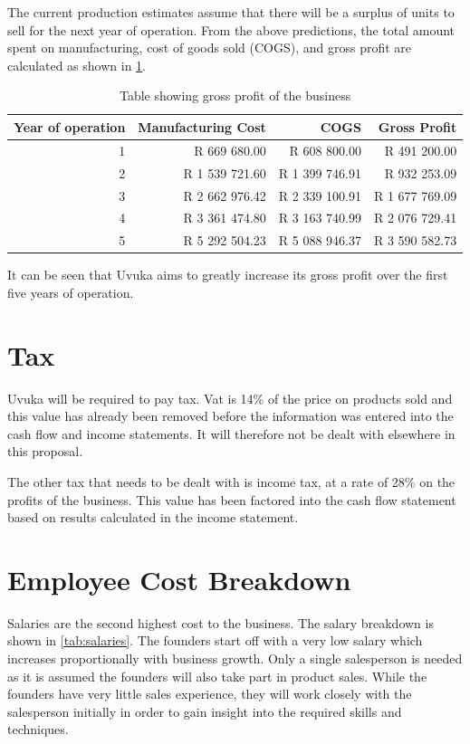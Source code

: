 The current production estimates assume that there will be a surplus of units to sell for the next year of operation. From the above predictions, the total amount spent on manufacturing, cost of goods sold (COGS), and gross profit are calculated as shown in \cref{tab:GrossProfit}. 

\begin{table}[htbp]
  \centering
  \caption{Table showing gross profit of the business}
    \begin{tabular}{rrrr}
    \toprule
    Year of operation & Manufacturing Cost & COGS  & Gross Profit \\
    \midrule
    1     & R 669 680.00 & R 608 800.00 & R 491 200.00 \\
    2     & R 1 539 721.60 & R 1 399 746.91 & R 932 253.09 \\
    3     & R 2 662 976.42 & R 2 339 100.91 & R 1 677 769.09 \\
    4     & R 3 361 474.80 & R 3 163 740.99 & R 2 076 729.41 \\
    5     & R 5 292 504.23 & R 5 088 946.37 & R 3 590 582.73 \\
    \bottomrule
    \end{tabular}%
  \label{tab:GrossProfit}%
\end{table}%

It can be seen that Uvuka aims to greatly increase its gross profit over the first five years of operation. 

\section{Tax}

Uvuka will be required to pay tax. Vat is 14\% of the price on products sold and this value has already been removed before the information was entered into the cash flow and income statements. It will therefore not be dealt with elsewhere in this proposal.

The other tax that needs to be dealt with is income tax, at a rate of 28\% on the profits of the business. This value has been factored into the cash flow statement based on results calculated in the income statement.

\newpage
\section{Employee Cost Breakdown}
Salaries are the second highest cost to the business. The salary breakdown is shown in \cref{tab:salaries}. The founders start off with a very low salary which increases proportionally with business growth. Only a single salesperson is needed as it is assumed the founders will also take part in product sales. While the founders have very little sales experience, they will work closely with the salesperson initially in order to gain insight into the required skills and techniques.

